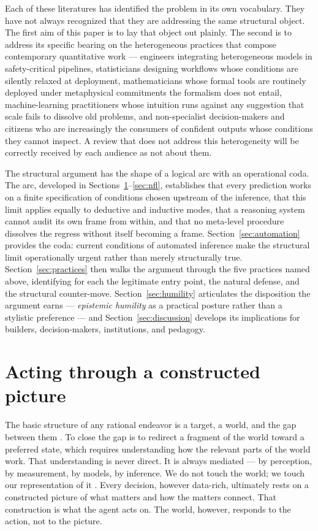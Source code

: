 \documentclass[11pt,a4paper]{article}
\begin{document}
Each of these literatures has identified the problem in its own
vocabulary. They have not always recognized that they are addressing the
same structural object. The first aim of this paper is to lay that object
out plainly. The second is to address its specific bearing on the
heterogeneous practices that compose contemporary quantitative work ---
engineers integrating heterogeneous models in safety-critical pipelines,
statisticians designing workflows whose conditions are silently relaxed at
deployment, mathematicians whose formal tools are routinely deployed under
metaphysical commitments the formalism does not entail,
machine-learning practitioners whose intuition runs against any suggestion
that scale fails to dissolve old problems, and non-specialist
decision-makers and citizens who are increasingly the consumers of
confident outputs whose conditions they cannot inspect. A review that does
not address this heterogeneity will be correctly received by each audience
as not about them.

The structural argument has the shape of a logical arc with an operational
coda. The arc, developed in Sections~\ref{sec:picture}--\ref{sec:nfl},
establishes that every prediction works on a finite specification of
conditions chosen upstream of the inference, that this limit applies
equally to deductive and inductive modes, that a reasoning system cannot
audit its own frame from within, and that no meta-level procedure
dissolves the regress without itself becoming a frame.
Section~\ref{sec:automation} provides the coda: current conditions of
automated inference make the structural limit operationally urgent rather
than merely structurally true. Section~\ref{sec:practices} then walks the
argument through the five practices named above, identifying for each
the legitimate entry point, the natural defense, and the structural
counter-move. Section~\ref{sec:humility} articulates the disposition the
argument earns --- \emph{epistemic humility} as a practical posture
rather than a stylistic preference --- and Section~\ref{sec:discussion}
develops its implications for builders, decision-makers, institutions,
and pedagogy.

\section{Acting through a constructed picture}
\label{sec:picture}

The basic structure of any rational endeavor is a target, a world, and the
gap between them \citep{Simon1982}. To close the gap is to redirect a
fragment of the world toward a preferred state, which requires
understanding how the relevant parts of the world work. That understanding
is never direct. It is always mediated --- by perception, by measurement,
by models, by inference. We do not touch the world; we touch our
representation of it \citep{Korzybski1933}. Every decision, however
data-rich, ultimately rests on a constructed picture of what matters and
how the matters connect. That construction is what the agent acts on. The
world, however, responds to the action, not to the picture.
\end{document}
